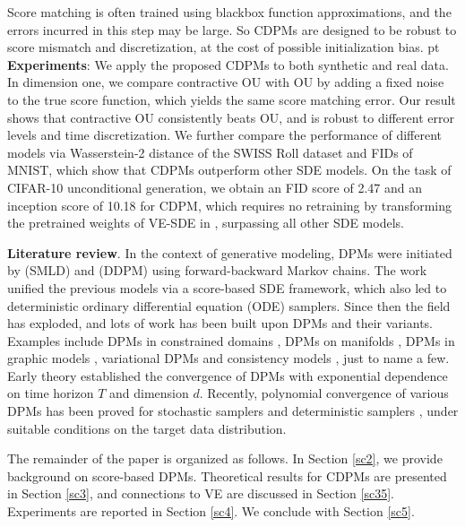 \documentclass[letterpaper,10pt,reqno]{amsart}
\numberwithin{equation}{section}
\begin{document}
Score matching is often trained using blackbox function approximations,
and the errors incurred in this step may be large. 
So CDPMs are designed to be robust to score mismatch
and discretization,
at the cost of possible initialization bias.
 pt
{\bf Experiments}: We apply the proposed CDPMs to both synthetic and real data. In dimension one, we compare contractive OU with OU by adding a fixed noise to the true score function, which yields the same score matching error. Our result shows that contractive OU consistently beats OU, and is robust to different error levels and time discretization. 
We further compare the performance of different models via 
Wasserstein-2 distance of the SWISS Roll dataset and FIDs of MNIST,
which show that CDPMs outperform other SDE models. 
On the task of CIFAR-10 unconditional generation,
we obtain an FID score of 2.47 and an inception score of 10.18 for CDPM, 
which requires no retraining by transforming the pretrained weights of VE-SDE in \cite{Song20}, surpassing all other SDE models.
 
\smallskip
\noindent
{\bf Literature review}.
In the context of generative modeling, 
DPMs were initiated by \cite{Song19} (SMLD) and \cite{Ho20} (DDPM)
using forward-backward Markov chains.
The work \cite{Song20, Song21} unified the previous models 
via a score-based SDE framework,
which also led to deterministic ordinary differential equation (ODE) samplers.
Since then the field has exploded, 
and lots of work has been built upon DPMs and their variants.
Examples include 
DPMs in constrained domains \cite{FK23, LE23, RDD22, DS22},
DPMs on manifolds \cite{Pid22, DeB22, CH23},
DPMs in graphic models \cite{Mei23},
variational DPMs \cite{Kingma21, VK21}
and consistency models \cite{SDC23},
just to name a few.
Early theory \cite{DV21, DeB22, KW22} established the convergence 
of DPMs with exponential dependence on time horizon $T$
and dimension $d$.
Recently, polynomial convergence of various DPMs has been proved
for stochastic samplers \cite{Chen23, Ben23a, LW23, GNZ23, LLT22, LLT23}
and deterministic samplers \cite{Ben23b, Chen23b, Chen23c, LW23},
under suitable conditions on the target data distribution. 

\medskip
\quad The remainder of the paper is organized as follows.
In Section \ref{sc2}, we provide background on score-based DPMs.
Theoretical results for CDPMs are presented in Section \ref{sc3},
and connections to VE are discussed in Section \ref{sc35}.
Experiments are reported in Section \ref{sc4}.
We conclude with Section \ref{sc5}.
\end{document}
